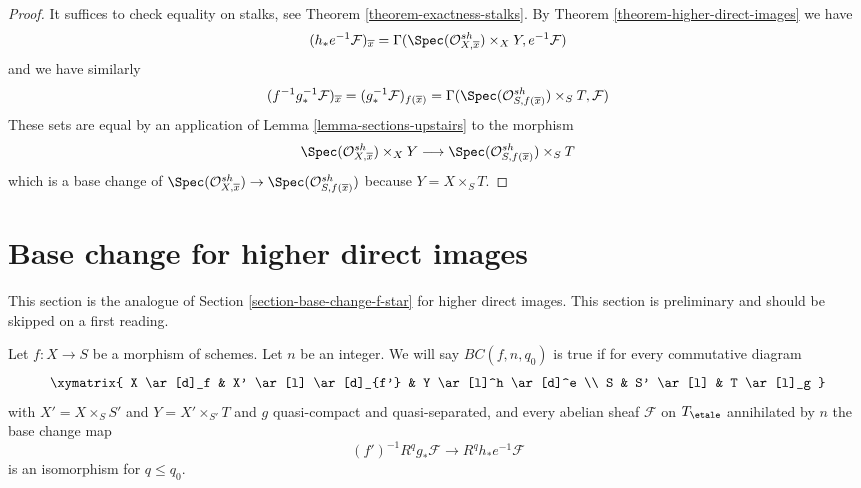 \begin{proof}
It suffices to check equality on stalks, see
Theorem \ref{theorem-exactness-stalks}.
By Theorem \ref{theorem-higher-direct-images} we have
$$
(h_*e^{-1}\mathcal{F})_{\overline{x}} =
\Gamma(\Spec(\mathcal{O}_{X, \overline{x}}^{sh}) \times_X Y, e^{-1}\mathcal{F})
$$
and we have similarly
$$
(f^{-1}g_*^{-1}\mathcal{F})_{\overline{x}} =
(g_*^{-1}\mathcal{F})_{f(\overline{x})} =
\Gamma(\Spec(\mathcal{O}_{S, f(\overline{x})}^{sh}) \times_S T, \mathcal{F})
$$
These sets are equal by an application of Lemma \ref{lemma-sections-upstairs}
to the morphism
$$
\Spec(\mathcal{O}_{X, \overline{x}}^{sh}) \times_X Y
\longrightarrow
\Spec(\mathcal{O}_{S, f(\overline{x})}^{sh}) \times_S T
$$
which is a base change of
$\Spec(\mathcal{O}_{X, \overline{x}}^{sh}) \to
\Spec(\mathcal{O}_{S, f(\overline{x})}^{sh})$
because $Y = X \times_S T$.
\end{proof}







\section{Base change for higher direct images}
\label{section-base-change}

\noindent
This section is the analogue of Section \ref{section-base-change-f-star}
for higher direct images.
This section is preliminary and should be skipped on a first reading.

\begin{remark}
\label{remark-base-change-holds}
Let $f : X \to S$ be a morphism of schemes. Let $n$ be an integer.
We will say $BC(f, n, q_0)$ is true if for every commutative diagram
$$
\xymatrix{
X \ar[d]_f & X' \ar[l] \ar[d]_{f'} & Y \ar[l]^h \ar[d]^e \\
S & S' \ar[l] & T \ar[l]_g
}
$$
with $X' = X \times_S S'$ and $Y = X' \times_{S'} T$ and
$g$ quasi-compact and quasi-separated, and every abelian sheaf
$\mathcal{F}$ on $T_\etale$ annihilated by $n$ the base change map
$$
(f')^{-1}R^qg_*\mathcal{F}
\longrightarrow
R^qh_*e^{-1}\mathcal{F}
$$
is an isomorphism for $q \leq q_0$.
\end{remark}

